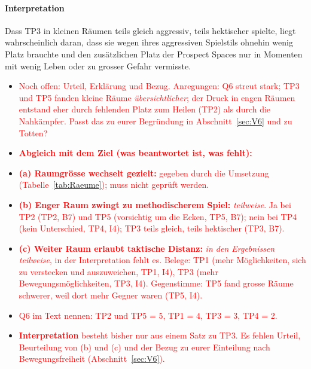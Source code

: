 \documentclass[../Main.tex]{subfiles}
\begin{document}
\paragraph{Interpretation}
Dass TP3 in kleinen Räumen teils gleich aggressiv, teils hektischer spielte, liegt wahrscheinlich daran, dass sie wegen ihres aggressiven Spielstils ohnehin wenig Platz brauchte und den zusätzlichen Platz der Prospect Spaces nur in Momenten mit wenig Leben oder zu grosser Gefahr vermisste.

\begin{itemize}[leftmargin=1.5cm]
    \item \textcolor{red}{Noch offen: Urteil, Erklärung und Bezug. Anregungen: Q6 streut stark; TP3 und TP5 fanden kleine Räume \emph{übersichtlicher}; der Druck in engen Räumen entstand eher durch fehlenden Platz zum Heilen (TP2) als durch die Nahkämpfer. Passt das zu eurer Begründung in Abschnitt~\ref{sec:V6} und zu Totten?}
\end{itemize}

\begin{itemize}[leftmargin=1.5cm]
    \item \textcolor{red}{\textbf{Abgleich mit dem Ziel (was beantwortet ist, was fehlt):}}
    \item \textcolor{red}{\textbf{(a) Raumgrösse wechselt gezielt:} gegeben durch die Umsetzung (Tabelle~\ref{tab:Raeume}); muss nicht geprüft werden.}
    \item \textcolor{red}{\textbf{(b) Enger Raum zwingt zu methodischerem Spiel:} \emph{teilweise}. Ja bei TP2 (TP2, B7) und TP5 (vorsichtig um die Ecken, TP5, B7); nein bei TP4 (kein Unterschied, TP4, I4); TP3 teils gleich, teils hektischer (TP3, B7).}
    \item \textcolor{red}{\textbf{(c) Weiter Raum erlaubt taktische Distanz:} \emph{in den Ergebnissen teilweise}, in der Interpretation fehlt es. Belege: TP1 (mehr Möglichkeiten, sich zu verstecken und auszuweichen, TP1, I4), TP3 (mehr Bewegungsmöglichkeiten, TP3, I4). Gegenstimme: TP5 fand grosse Räume schwerer, weil dort mehr Gegner waren (TP5, I4).}
    \item \textcolor{red}{Q6 im Text nennen: TP2 und TP5 = 5, TP1 = 4, TP3 = 3, TP4 = 2.}
    \item \textcolor{red}{\textbf{Interpretation} besteht bisher nur aus einem Satz zu TP3. Es fehlen Urteil, Beurteilung von (b) und (c) und der Bezug zu eurer Einteilung nach Bewegungsfreiheit (Abschnitt~\ref{sec:V6}).}
\end{itemize}
\end{document}
